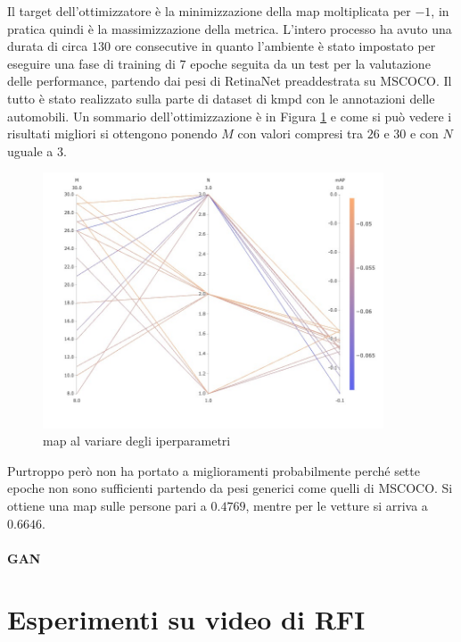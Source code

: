 Il target dell'ottimizzatore è la minimizzazione della \ac{map} moltiplicata per $-1$, in pratica quindi è la massimizzazione della metrica. L'intero processo ha avuto una durata di circa $130$ ore consecutive in quanto l'ambiente è stato impostato per eseguire una fase di training di $7$ epoche seguita da un test per la valutazione delle performance, partendo dai pesi di RetinaNet preaddestrata su \ac{MSCOCO}. Il tutto è stato realizzato sulla parte di dataset di \ac{kmpd} con le annotazioni delle automobili. Un sommario dell'ottimizzazione è in Figura \ref{fig:map_comet_ml} e come si può vedere i risultati migliori si ottengono ponendo $M$ con valori compresi tra $26$ e $30$ e con $N$ uguale a $3$.
\begin{figure}[]
    \centering
    \includegraphics[width=0.9\textwidth]{images/graphic/mAP_comet.jpeg}
    \caption{\ac{map} al variare degli iperparametri}
    \label{fig:map_comet_ml}
\end{figure}

Purtroppo però non ha portato a miglioramenti probabilmente perché sette epoche non sono sufficienti partendo da pesi generici come quelli di \ac{MSCOCO}. Si ottiene una \ac{map} sulle persone pari a $0.4769$, mentre per le vetture si arriva a $0.6646$. 

\paragraph{GAN}

\section{Esperimenti su video di RFI}
\label{sec:RFI_video_experiment}

